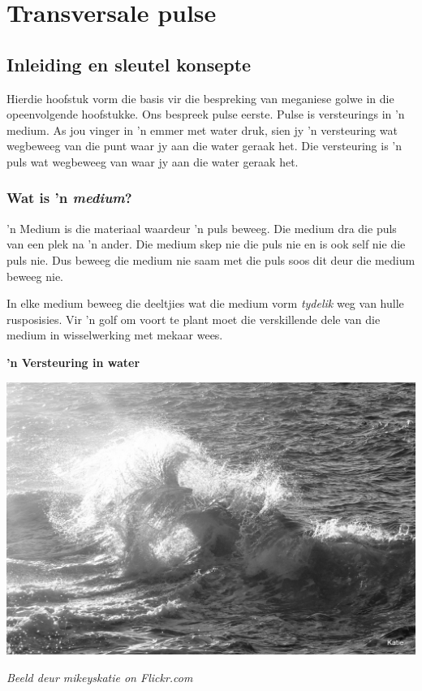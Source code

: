 \chapter{Transversale pulse}
         

\section{Inleiding en sleutel konsepte}
    \nopagebreak
    \label{m38801*cid2}
Hierdie hoofstuk vorm die basis vir die bespreking van meganiese golwe in die opeenvolgende hoofstukke. Ons bespreek pulse eerste. Pulse is versteurings in 'n medium. As jou vinger in 'n emmer met water druk, sien jy 'n versteuring wat wegbeweeg van die punt waar jy aan die water geraak het. Die versteuring is 'n puls wat wegbeweeg van waar jy aan die water geraak het.
            

\subsection*{Wat is 'n \textsl{medium}?}
            \nopagebreak
\begin{minipage}{.5\textwidth}

 'n Medium is die materiaal waardeur 'n puls beweeg. Die medium dra die puls van een plek na 'n ander. Die medium skep nie die puls nie en is ook self nie die puls nie. Dus beweeg die medium nie saam met die puls soos dit deur die medium beweeg nie.

In elke medium beweeg die deeltjies wat die medium vorm \textit{tydelik} weg van hulle rusposisies. Vir 'n golf om voort te plant moet die verskillende dele van die medium in wisselwerking met mekaar wees.
\end{minipage}
\begin{minipage}{.5\textwidth}
\begin{center}
\textbf{ 'n Versteuring in water}\par
 \includegraphics[width=.8\textwidth]{photos/waveby-mikeyskatie-flickr.jpg}\par
\textit{\small Beeld deur mikeyskatie on Flickr.com}
\end{center}
\end{minipage}


